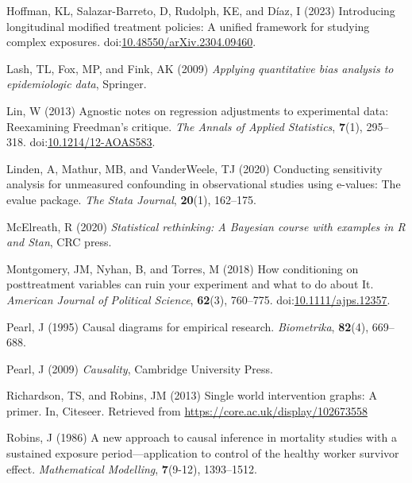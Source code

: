 \documentclass[
  single column]{article}
\newlength{\cslhangindent}
\newenvironment{CSLReferences}[2] %
 {\begin{list}{}{%
  \setlength{\itemindent}{0pt}
  \setlength{\leftmargin}{0pt}
  \setlength{\parsep}{0pt}
  \ifodd #1
   \setlength{\leftmargin}{\cslhangindent}
   \setlength{\itemindent}{-1\cslhangindent}
  \fi
  \setlength{\itemsep}{#2\baselineskip}}}
 {\end{list}}
\begin{document}
\begin{CSLReferences}{1}{0}
Hoffman, KL, Salazar-Barreto, D, Rudolph, KE, and Díaz, I (2023)
Introducing longitudinal modified treatment policies: A unified
framework for studying complex exposures.
doi:\href{https://doi.org/10.48550/arXiv.2304.09460}{10.48550/arXiv.2304.09460}.

Lash, TL, Fox, MP, and Fink, AK (2009) \emph{Applying quantitative bias
analysis to epidemiologic data}, Springer.

Lin, W (2013) {Agnostic notes on regression adjustments to experimental
data: Reexamining Freedman's critique}. \emph{The Annals of Applied
Statistics}, \textbf{7}(1), 295--318.
doi:\href{https://doi.org/10.1214/12-AOAS583}{10.1214/12-AOAS583}.

Linden, A, Mathur, MB, and VanderWeele, TJ (2020) Conducting sensitivity
analysis for unmeasured confounding in observational studies using
e-values: The evalue package. \emph{The Stata Journal}, \textbf{20}(1),
162--175.

McElreath, R (2020) \emph{Statistical rethinking: A {B}ayesian course
with examples in {R} and {S}tan}, CRC press.

Montgomery, JM, Nyhan, B, and Torres, M (2018) How conditioning on
posttreatment variables can ruin your experiment and what to do about
It. \emph{American Journal of Political Science}, \textbf{62}(3),
760--775.
doi:\href{https://doi.org/10.1111/ajps.12357}{10.1111/ajps.12357}.

Pearl, J (1995) Causal diagrams for empirical research.
\emph{Biometrika}, \textbf{82}(4), 669--688.

Pearl, J (2009) \emph{Causality}, Cambridge University Press.

Richardson, TS, and Robins, JM (2013) Single world intervention graphs:
A primer. In, Citeseer. Retrieved from
\url{https://core.ac.uk/display/102673558}

Robins, J (1986) A new approach to causal inference in mortality studies
with a sustained exposure period---application to control of the healthy
worker survivor effect. \emph{Mathematical Modelling}, \textbf{7}(9-12),
1393--1512.


\end{CSLReferences}
\end{document}
